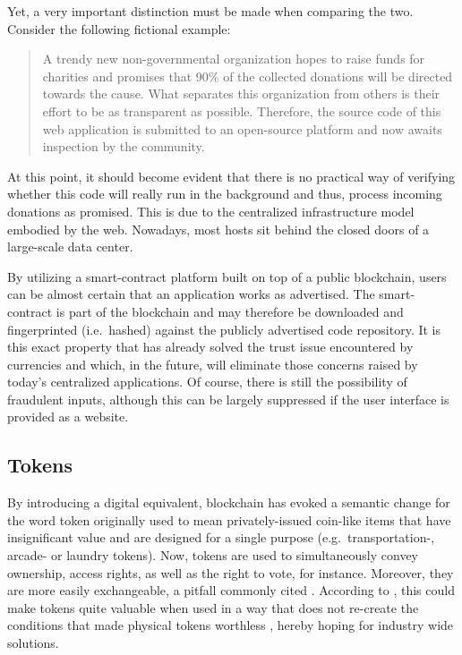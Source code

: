 Yet, a very important distinction must be made when comparing the two. Consider the following fictional example: 

\begin{quotation}
A trendy new non-governmental organization hopes to raise funds for charities and promises that 90\% of the collected donations will be directed towards the cause. What separates this organization from others is their effort to be as transparent as possible. Therefore, the source code of this web application is submitted to an open-source platform and now awaits inspection by the community.
\end{quotation}

At this point, it should become evident that there is no practical way of verifying whether this code will really run in the background and thus, process incoming donations as promised. This is due to the centralized infrastructure model embodied by the web. Nowadays, most hosts sit behind the closed doors of a large-scale data center.

By utilizing a smart-contract platform built on top of a public blockchain, users can be almost certain that an application works as advertised. The smart-contract is part of the blockchain and may therefore be downloaded and fingerprinted (i.e.~hashed) against the publicly advertised code repository. It is this exact property that has already solved the trust issue encountered by currencies and which, in the future, will eliminate those concerns raised by today's centralized applications. Of course, there is still the possibility of fraudulent inputs, although this can be largely suppressed if the user interface is provided as a website.
	
\subsection{Tokens}
\label{sec:tokens}
By introducing a digital equivalent, blockchain has evoked a semantic change for the word token originally used to mean privately-issued coin-like items that have insignificant value and are designed for a single purpose (e.g.~transportation-, arcade- or laundry tokens). Now, tokens are used to simultaneously convey ownership, access rights, as well as the right to vote, for instance. Moreover, they are more easily exchangeable, a pitfall commonly cited \cite[p.~173]{Antonopoulos.2018}. According to \citeauthor{Antonopoulos.2018}, this could make tokens quite valuable when used in a way that does not re-create the conditions that made physical tokens worthless \cite[p.~178]{Antonopoulos.2018}, hereby hoping for industry wide solutions. 

